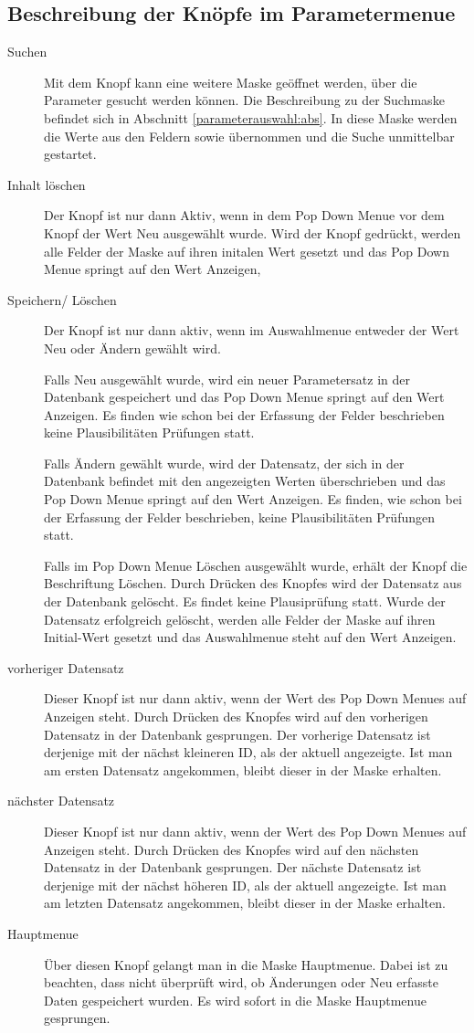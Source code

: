\subsection{Beschreibung der Knöpfe im Parametermenue}
\begin{description}
\item[Suchen] Mit dem Knopf  kann eine weitere Maske geöffnet
werden, über die Parameter gesucht werden können. Die Beschreibung zu der
Suchmaske befindet sich in Abschnitt \vref{parameterauswahl:abs}.
In diese Maske werden die Werte aus den Feldern  sowie
 übernommen und die Suche unmittelbar gestartet.
\item[Inhalt löschen] Der Knopf  ist nur dann
Aktiv, wenn in dem
Pop Down Menue vor dem Knopf der Wert Neu ausgewählt wurde. Wird der Knopf
gedrückt, werden alle Felder der Maske auf ihren initalen Wert gesetzt und das
Pop Down Menue springt auf den Wert Anzeigen,
\item[Speichern/ Löschen] Der Knopf  ist nur dann aktiv,
wenn im Auswahlmenue entweder der Wert Neu oder Ändern gewählt wird. 
\par
Falls Neu 
ausgewählt wurde, wird ein neuer Parametersatz in der Datenbank gespeichert
und das Pop Down Menue springt auf den Wert Anzeigen. Es finden wie
schon bei der Erfassung der Felder beschrieben keine Plausibilitäten
Prüfungen statt.\par
Falls Ändern gewählt wurde, wird der Datensatz, der sich in der Datenbank
befindet mit den angezeigten Werten überschrieben und das Pop Down Menue
springt auf den Wert Anzeigen. 
Es finden, wie
schon bei der Erfassung der Felder beschrieben, keine Plausibilitäten
Prüfungen statt.\par
Falls im Pop Down Menue Löschen ausgewählt wurde, erhält der Knopf die
Beschriftung Löschen. Durch Drücken des Knopfes wird der Datensatz aus der
Datenbank gelöscht. Es findet keine Plausiprüfung statt.
Wurde der Datensatz erfolgreich gelöscht, werden
alle Felder der Maske auf ihren Initial-Wert gesetzt und das Auswahlmenue
steht auf den Wert Anzeigen.
\item[vorheriger Datensatz] Dieser Knopf ist nur dann aktiv, wenn der Wert
des Pop Down Menues auf Anzeigen steht. Durch Drücken des Knopfes wird auf
den vorherigen Datensatz in der Datenbank gesprungen. Der vorherige Datensatz
ist derjenige mit der nächst kleineren ID, als der aktuell angezeigte. Ist
man am ersten Datensatz angekommen, bleibt dieser in der Maske erhalten.
\item[nächster Datensatz] Dieser Knopf ist nur dann aktiv, wenn der Wert
des Pop Down Menues auf Anzeigen steht. Durch Drücken des Knopfes wird auf
den nächsten Datensatz in der Datenbank gesprungen. Der nächste Datensatz
ist derjenige mit der nächst höheren ID, als der aktuell angezeigte. Ist
man am letzten Datensatz angekommen, bleibt dieser in der Maske erhalten.
\item[Hauptmenue] Über diesen Knopf gelangt man in die Maske Hauptmenue.
Dabei ist zu beachten, dass nicht überprüft wird, ob Änderungen oder Neu
erfasste Daten gespeichert wurden. Es wird sofort in die Maske Hauptmenue
gesprungen.
\end{description}

